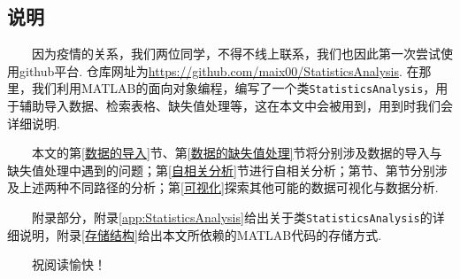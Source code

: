 \documentclass[a4paper, titlepage]{article}
\begin{document}
        \subsection{说明}
        　　因为疫情的关系，我们两位同学，不得不线上联系，我们也因此第一次尝试使用github平台. 仓库网址为\url{https://github.com/maix00/StatisticsAnalysis}. 在那里，我们利用MATLAB的面向对象编程，编写了一个类\texttt{StatisticsAnalysis}，用于辅助导入数据、检索表格、缺失值处理等，这在本文中会被用到，用到时我们会详细说明.

        　　本文的第\ref{数据的导入}节、第\ref{数据的缺失值处理}节将分别涉及数据的导入与缺失值处理中遇到的问题；第\ref{自相关分析}节进行自相关分析；第节、第节分别涉及上述两种不同路径的分析；第\ref{可视化}探索其他可能的数据可视化与数据分析.
        
        　　附录部分，附录\ref{app:StatisticsAnalysis}给出关于类\texttt{StatisticsAnalysis}的详细说明，附录\ref{存储结构}给出本文所依赖的MATLAB代码的存储方式.

        　　祝阅读愉快！
    
    \newpage
\end{document}
